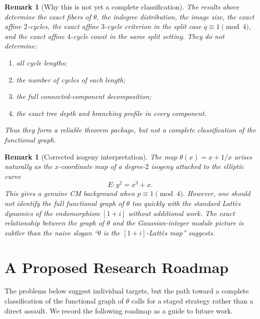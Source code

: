 \documentclass[11pt]{article}
\newtheorem{remark}[theorem]{Remark}
\begin{document}
\begin{remark}[Why this is not yet a complete classification]
\label{rem:not-complete}
The results above determine the exact fibers of $\theta$, the indegree distribution, the image size, the exact affine $2$-cycles, the exact affine $3$-cycle criterion in the split case $q\equiv 1\pmod4$, and the exact affine $4$-cycle count in the same split setting.
They do \emph{not} determine:
\begin{enumerate}[label=\textup{(\roman*)}]
\item all cycle lengths;
\item the number of cycles of each length;
\item the full connected-component decomposition;
\item the exact tree depth and branching profile in every component.
\end{enumerate}
Thus they form a reliable theorem package, but not a complete classification of the functional graph.
\end{remark}

\begin{remark}[Corrected isogeny interpretation]
\label{rem:isogeny}
The map $\theta(x)=x+1/x$ arises naturally as the $x$-coordinate map of a degree-$2$ isogeny attached to the elliptic curve
\[
E:y^2=x^3+x.
\]
This gives a genuine CM background when $p\equiv 1\pmod4$.
However, one should not identify the full functional graph of $\theta$ too quickly with the standard Latt\`es dynamics of the endomorphism $[1+i]$ without additional work.
The exact relationship between the graph of $\theta$ and the Gaussian-integer module picture is subtler than the naive slogan ``$\theta$ is the $[1+i]$-Latt\`es map'' suggests.
\end{remark}

\section{A Proposed Research Roadmap}

The problems below suggest individual targets, but the path toward a complete classification of the functional graph of $\theta$ calls for a staged strategy rather than a direct assault.
We record the following roadmap as a guide to future work.
\end{document}
